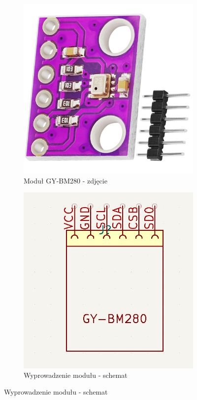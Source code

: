 \documentclass[11pt, a4paper]{article}
\begin{document}
\vspace{0.75cm}
\begin{figure}[h]
\centering
\begin{subfigure}{.5\textwidth}
\centering
\includegraphics[width=.7\linewidth]{fig/GY-BM280/gy-bm280_photo_2.jpg}
\caption{Moduł GY-BM280 - zdjęcie \cite{Amazon:Zdjęcie}}
\label{fig:_zdjecie_modulu}
\end{subfigure}%
\begin{subfigure}{.5\textwidth}
\centering
\includegraphics[width=.7\linewidth]{fig/GY-BM280/wyprowadzenia.PNG}
\caption{Wyprowadzenie modułu - schemat}
\label{fig:_schemat_modulu}
\end{subfigure}
\label{fig:modul}
\end{figure}
\vspace{0.5cm}
\end{document}
